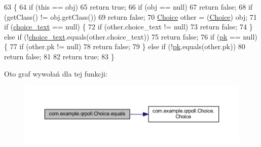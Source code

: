 \begin{DoxyCode}
63                                       \{
64         \textcolor{keywordflow}{if} (\textcolor{keyword}{this} == obj)
65             \textcolor{keywordflow}{return} \textcolor{keyword}{true};
66         \textcolor{keywordflow}{if} (obj == null)
67             \textcolor{keywordflow}{return} \textcolor{keyword}{false};
68         \textcolor{keywordflow}{if} (getClass() != obj.getClass())
69             \textcolor{keywordflow}{return} \textcolor{keyword}{false};
70         \hyperlink{classcom_1_1example_1_1qrpoll_1_1_choice_a66024b291117e1d6986ee90f836fd208}{Choice} other = (\hyperlink{classcom_1_1example_1_1qrpoll_1_1_choice_a66024b291117e1d6986ee90f836fd208}{Choice}) obj;
71         \textcolor{keywordflow}{if} (\hyperlink{classcom_1_1example_1_1qrpoll_1_1_choice_ab336c2005a764a1d28450c206eeb4ed0}{choice\_text} == null) \{
72             \textcolor{keywordflow}{if} (other.choice\_text != null)
73                 \textcolor{keywordflow}{return} \textcolor{keyword}{false};
74         \} \textcolor{keywordflow}{else} \textcolor{keywordflow}{if} (!\hyperlink{classcom_1_1example_1_1qrpoll_1_1_choice_ab336c2005a764a1d28450c206eeb4ed0}{choice\_text}.equals(other.choice\_text))
75             \textcolor{keywordflow}{return} \textcolor{keyword}{false};
76         \textcolor{keywordflow}{if} (\hyperlink{classcom_1_1example_1_1qrpoll_1_1_choice_a6213ee79d3a08c00ca588b9813b7e912}{pk} == null) \{
77             \textcolor{keywordflow}{if} (other.pk != null)
78                 \textcolor{keywordflow}{return} \textcolor{keyword}{false};
79         \} \textcolor{keywordflow}{else} \textcolor{keywordflow}{if} (!\hyperlink{classcom_1_1example_1_1qrpoll_1_1_choice_a6213ee79d3a08c00ca588b9813b7e912}{pk}.equals(other.pk))
80             \textcolor{keywordflow}{return} \textcolor{keyword}{false};
81         
82         \textcolor{keywordflow}{return} \textcolor{keyword}{true};
83     \}
\end{DoxyCode}


Oto graf wywołań dla tej funkcji\+:
\nopagebreak
\begin{figure}[H]
\begin{center}
\leavevmode
\includegraphics[width=350pt]{classcom_1_1example_1_1qrpoll_1_1_choice_ad4e5a0f7bb62a19e63fc4600e6d16c67_cgraph}
\end{center}
\end{figure}


